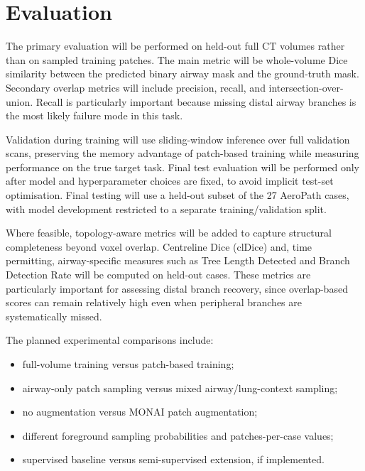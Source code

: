 \documentclass[11pt,a4paper]{article}
\begin{document}
\section{Evaluation}

The primary evaluation will be performed on held-out full CT volumes rather than on sampled training patches. The main metric will be whole-volume Dice similarity between the predicted binary airway mask and the ground-truth mask. Secondary overlap metrics will include precision, recall, and intersection-over-union. Recall is particularly important because missing distal airway branches is the most likely failure mode in this task.

Validation during training will use sliding-window inference over full validation scans, preserving the memory advantage of patch-based training while measuring performance on the true target task. Final test evaluation will be performed only after model and hyperparameter choices are fixed, to avoid implicit test-set optimisation. Final testing will use a held-out subset of the 27 AeroPath cases, with model development restricted to a separate training/validation split.

Where feasible, topology-aware metrics will be added to capture structural completeness beyond voxel overlap. Centreline Dice (clDice) and, time permitting, airway-specific measures such as Tree Length Detected and Branch Detection Rate will be computed on held-out cases. These metrics are particularly important for assessing distal branch recovery, since overlap-based scores can remain relatively high even when peripheral branches are systematically missed.

The planned experimental comparisons include:
\begin{itemize}
    \item full-volume training versus patch-based training;
    \item airway-only patch sampling versus mixed airway/lung-context sampling;
    \item no augmentation versus MONAI patch augmentation;
    \item different foreground sampling probabilities and patches-per-case values;
    \item supervised baseline versus semi-supervised extension, if implemented.
\end{itemize}
\end{document}
